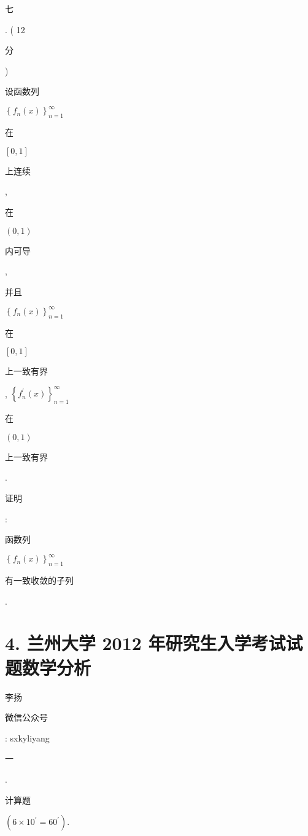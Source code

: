 \documentclass[10pt]{article}
\begin{document}
\begin{CJK}{UTF8}{mj}七\end{CJK}. ( 12 \begin{CJK}{UTF8}{mj}分\end{CJK}) \begin{CJK}{UTF8}{mj}设函数列\end{CJK} $\left\{f_{n}(x)\right\}_{n=1}^{\infty}$ \begin{CJK}{UTF8}{mj}在\end{CJK} $[0,1]$ \begin{CJK}{UTF8}{mj}上连续\end{CJK}, \begin{CJK}{UTF8}{mj}在\end{CJK} $(0,1)$ \begin{CJK}{UTF8}{mj}内可导\end{CJK}, \begin{CJK}{UTF8}{mj}并且\end{CJK} $\left\{f_{n}(x)\right\}_{n=1}^{\infty}$ \begin{CJK}{UTF8}{mj}在\end{CJK} $[0,1]$ \begin{CJK}{UTF8}{mj}上一致有界\end{CJK}, $\left\{f_{n}^{\prime}(x)\right\}_{n=1}^{\infty}$ \begin{CJK}{UTF8}{mj}在\end{CJK} $(0,1)$ \begin{CJK}{UTF8}{mj}上一致有界\end{CJK}. \begin{CJK}{UTF8}{mj}证明\end{CJK}: \begin{CJK}{UTF8}{mj}函数列\end{CJK} $\left\{f_{n}(x)\right\}_{n=1}^{\infty}$ \begin{CJK}{UTF8}{mj}有一致收敛的子列\end{CJK}.

\section{4. 兰州大学 2012 年研究生入学考试试题数学分析}
\begin{CJK}{UTF8}{mj}李扬\end{CJK}

\begin{CJK}{UTF8}{mj}微信公众号\end{CJK}: sxkyliyang

\begin{CJK}{UTF8}{mj}一\end{CJK}. \begin{CJK}{UTF8}{mj}计算题\end{CJK} $\left(6 \times 10^{\prime}=60^{\prime}\right)$.
\end{document}
